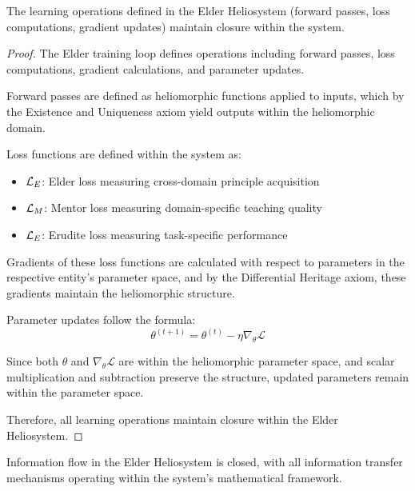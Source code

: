 \begin{theorem}
The learning operations defined in the Elder Heliosystem (forward passes, loss computations, gradient updates) maintain closure within the system.
\end{theorem}

\begin{proof}
The Elder training loop defines operations including forward passes, loss computations, gradient calculations, and parameter updates.

Forward passes are defined as heliomorphic functions applied to inputs, which by the Existence and Uniqueness axiom yield outputs within the heliomorphic domain.

Loss functions are defined within the system as:
\begin{itemize}
    \item $\mathcal{L}_E$: Elder loss measuring cross-domain principle acquisition
    \item $\mathcal{L}_M$: Mentor loss measuring domain-specific teaching quality
    \item $\mathcal{L}_E$: Erudite loss measuring task-specific performance
\end{itemize}

Gradients of these loss functions are calculated with respect to parameters in the respective entity's parameter space, and by the Differential Heritage axiom, these gradients maintain the heliomorphic structure.

Parameter updates follow the formula:
\begin{equation}
\theta^{(t+1)} = \theta^{(t)} - \eta \nabla_{\theta} \mathcal{L}
\end{equation}

Since both $\theta$ and $\nabla_{\theta} \mathcal{L}$ are within the heliomorphic parameter space, and scalar multiplication and subtraction preserve the structure, updated parameters remain within the parameter space.

Therefore, all learning operations maintain closure within the Elder Heliosystem.
\end{proof}

\begin{theorem}
Information flow in the Elder Heliosystem is closed, with all information transfer mechanisms operating within the system's mathematical framework.
\end{theorem}


